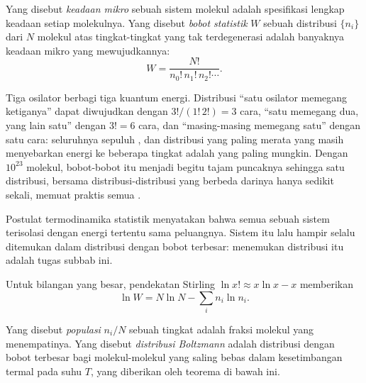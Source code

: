 \begin{definition}\label{def:b3:partition-functions:microstate}
Yang disebut \emph{keadaan mikro} sebuah sistem molekul
adalah spesifikasi lengkap keadaan setiap molekulnya. Yang disebut
\emph{bobot statistik} $W$ sebuah distribusi $\{n_i\}$
dari $N$ molekul atas tingkat-tingkat yang tak terdegenerasi adalah banyaknya
keadaan mikro yang mewujudkannya:
\[
  W = \frac{N!}{n_0!\,n_1!\,n_2!\cdots}.
\]
\end{definition}

\begin{example}\label{ex:b3:partition-functions:three-quanta}
Tiga osilator berbagi tiga kuantum energi. Distribusi ``satu osilator memegang
ketiganya'' dapat diwujudkan dengan $3!/(1!\,2!) = 3$ cara, ``satu memegang
dua, yang lain satu'' dengan $3! = 6$ cara, dan ``masing-masing memegang satu''
dengan satu cara: seluruhnya sepuluh , dan distribusi yang
paling merata yang masih menyebarkan energi ke beberapa tingkat adalah yang
paling mungkin. Dengan $10^{23}$ molekul, bobot-bobot itu menjadi begitu
tajam puncaknya sehingga satu distribusi, bersama distribusi-distribusi yang
berbeda darinya hanya sedikit sekali, memuat praktis semua .
\end{example}

\begin{remark}
Postulat termodinamika statistik menyatakan bahwa semua  sebuah
sistem terisolasi dengan energi tertentu sama peluangnya. Sistem itu lalu
hampir selalu ditemukan dalam distribusi dengan bobot terbesar: menemukan
distribusi itu adalah tugas subbab ini.
\end{remark}

Untuk bilangan yang besar, pendekatan Stirling $\ln x! \approx x\ln x - x$ memberikan
\[
  \ln W = N\ln N - \sum_i n_i\ln n_i .
\]

\begin{definition}\label{def:b3:partition-functions:boltzmann}
Yang disebut \emph{populasi} $n_i/N$ sebuah tingkat adalah
fraksi molekul yang menempatinya. Yang disebut \emph{distribusi
Boltzmann} adalah distribusi dengan bobot terbesar
bagi molekul-molekul yang saling bebas dalam kesetimbangan termal pada suhu
$T$, yang diberikan oleh teorema di bawah ini.
\end{definition}

